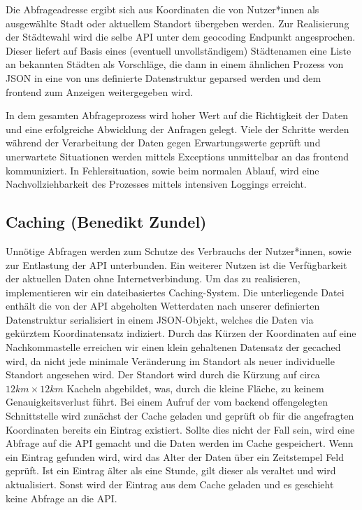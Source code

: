 \documentclass{article}
\begin{document}
Die Abfrageadresse ergibt sich aus Koordinaten die von Nutzer*innen als ausgewählte Stadt oder aktuellem Standort übergeben werden. Zur Realisierung der Städtewahl wird die selbe API unter dem geocoding Endpunkt angesprochen. Dieser liefert auf Basis eines (eventuell unvollständigem) Städtenamen eine Liste an bekannten Städten als Vorschläge, die dann in einem ähnlichen Prozess von JSON in eine von uns definierte Datenstruktur geparsed werden und dem frontend zum Anzeigen weitergegeben wird.

In dem gesamten Abfrageprozess wird hoher Wert auf die Richtigkeit der Daten und eine erfolgreiche Abwicklung der Anfragen gelegt. Viele der Schritte werden während der Verarbeitung der Daten gegen Erwartungswerte geprüft und unerwartete Situationen werden mittels Exceptions unmittelbar an das frontend kommuniziert. In Fehlersituation, sowie beim normalen Ablauf, wird eine Nachvollziehbarkeit des Prozesses mittels intensiven Loggings erreicht.

\subsection{Caching \small{(Benedikt Zundel)}}
Unnötige Abfragen werden zum Schutze des Verbrauchs der Nutzer*innen, sowie zur Entlastung der API unterbunden. Ein weiterer Nutzen ist die Verfügbarkeit der aktuellen Daten ohne Internetverbindung. Um das zu realisieren, implementieren wir ein dateibasiertes Caching-System. Die unterliegende Datei enthält die von der API abgeholten Wetterdaten nach unserer definierten Datenstruktur serialisiert in einem JSON-Objekt, welches die Daten via gekürztem Koordinatensatz indiziert. Durch das Kürzen der Koordinaten auf eine Nachkommastelle erreichen wir einen klein gehaltenen Datensatz der gecached wird, da nicht jede minimale Veränderung im Standort als neuer individuelle Standort angesehen wird. Der Standort wird durch die Kürzung auf circa $ 12 km \times 12 km $ Kacheln abgebildet, was, durch die kleine Fläche, zu keinem Genauigkeitsverlust führt.
Bei einem Aufruf der vom backend offengelegten Schnittstelle wird zunächst der Cache geladen und geprüft ob für die angefragten Koordinaten bereits ein Eintrag existiert. Sollte dies nicht der Fall sein, wird eine Abfrage auf die API gemacht und die Daten werden im Cache gespeichert. Wenn ein Eintrag gefunden wird, wird das Alter der Daten über ein Zeitstempel Feld geprüft. Ist ein Eintrag älter als eine Stunde, gilt dieser als veraltet und wird aktualisiert. Sonst wird der Eintrag aus dem Cache geladen und es geschieht keine Abfrage an die API.

\newpage



\end{document}
